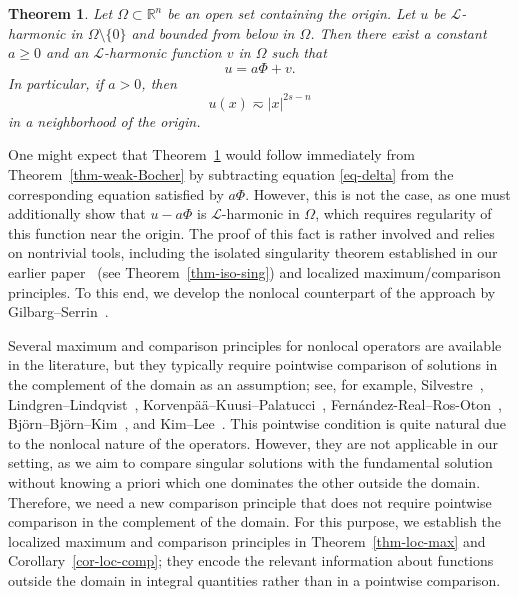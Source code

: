 \documentclass[11pt]{amsart}
\theoremstyle{plain}
\newtheorem{theorem}{Theorem}[section]
\theoremstyle{definition}
\numberwithin{equation}{section}
\begin{document}
\begin{theorem}\label{thm-Bocher}
Let $\Omega \subset \mathbb{R}^n$ be an open set containing the origin. Let $u$ be $\mathcal{L}$-harmonic in $\Omega \setminus \{0\}$ and bounded from below in $\Omega$. Then there exist a constant $a \geq 0$ and an $\mathcal{L}$-harmonic function $v$ in $\Omega$ such that
\begin{equation*}
u = a\Phi + v.
\end{equation*}
In particular, if $a>0$, then
\begin{equation*}
u(x) \eqsim |x|^{2s-n}
\end{equation*}
in a neighborhood of the origin.
\end{theorem}

One might expect that Theorem~\ref{thm-Bocher} would follow immediately from Theorem~\ref{thm-weak-Bocher} by subtracting equation \eqref{eq-delta} from the corresponding equation satisfied by $a\Phi$. However, this is not the case, as one must additionally show that $u-a\Phi$ is $\mathcal{L}$-harmonic in $\Omega$, which requires regularity of this function near the origin. The proof of this fact is rather involved and relies on nontrivial tools, including the isolated singularity theorem established in our earlier paper~\cite{KL24} (see Theorem~\ref{thm-iso-sing}) and localized maximum/comparison principles. To this end, we develop the nonlocal counterpart of the approach by Gilbarg--Serrin~\cite{GS56}.

Several maximum and comparison principles for nonlocal operators are available in the literature, but they typically require pointwise comparison of solutions in the complement of the domain as an assumption; see, for example, Silvestre~\cite[Proposition~2.21]{Sil07}, Lindgren--Lindqvist~\cite[Lemma~9]{LL14}, Korvenp\"a\"a--Kuusi--Palatucci~\cite[Lemma~6]{KKP17}, Fern\'andez-Real--Ros-Oton~\cite[Lemma~2.3.3 and Corollary 2.3.4]{FRRO24}, Bj\"orn--Bj\"orn--Kim~\cite[Corollary~3.6]{BBK24}, and Kim--Lee~\cite[Lemma~5.2]{KL23}. This pointwise condition is quite natural due to the nonlocal nature of the operators. However, they are not applicable in our setting, as we aim to compare singular solutions with the fundamental solution without knowing a priori which one dominates the other outside the domain. Therefore, we need a new comparison principle that does not require pointwise comparison in the complement of the domain. For this purpose, we establish the localized maximum and comparison principles in Theorem~\ref{thm-loc-max} and Corollary~\ref{cor-loc-comp}; they encode the relevant information about functions outside the domain in integral quantities rather than in a pointwise comparison.
\end{document}
